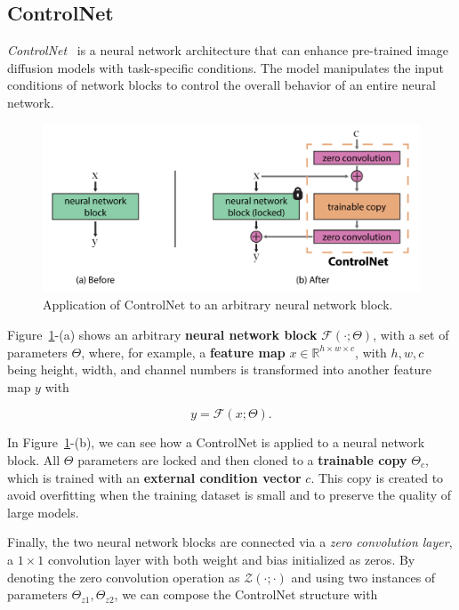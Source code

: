 \documentclass[preprint]{elsarticle}
\begin{document}
\subsection{ControlNet}\label{sect:controlnet}

\emph{ControlNet}~\cite{zhang2023adding} is a neural network architecture that can enhance  pre-trained image diffusion models with task-specific conditions.  The model manipulates the input conditions of network blocks to control the overall behavior of an entire neural network.

\begin{figure}[b]
	\centering
    \includegraphics[scale=0.8]{img/svg/Controlnet1.png}
	\caption{Application of ControlNet to an arbitrary neural network block.}\label{fig:controlnet}
\end{figure}


Figure~\ref{fig:controlnet}-(a) shows an arbitrary \textbf{neural network block} $\mathcal{F}(\cdot;\Theta)$,  with a set of parameters $\Theta$, where, for example, a \textbf{feature map} $x \in \mathbb{R}^{h\times w \times c}$, with ${h,w,c}$  being height, width, and channel numbers is transformed into another feature map $y$ with

\begin{equation}
	y = \mathcal{F}(x;\Theta).
\end{equation}

In Figure~\ref{fig:controlnet}-(b), we can see how a ControlNet is applied to a neural network block.
All $\Theta$ parameters are locked and then cloned to a \textbf{trainable copy} $\Theta_c$, 
which is trained with an \textbf{external condition vector} $c$.  This copy is created to avoid overfitting when the training dataset is small  and to preserve the quality of large models. 

Finally, the two neural network blocks are connected via a \emph{zero convolution layer},  a $1\times1$ convolution layer with both weight and bias initialized as zeros. By denoting the zero convolution operation as $\mathcal{Z}(\cdot;\cdot)$ and using two instances of parameters ${\Theta_{z1},\Theta_{z2}}$, we can compose the ControlNet structure with
\end{document}
